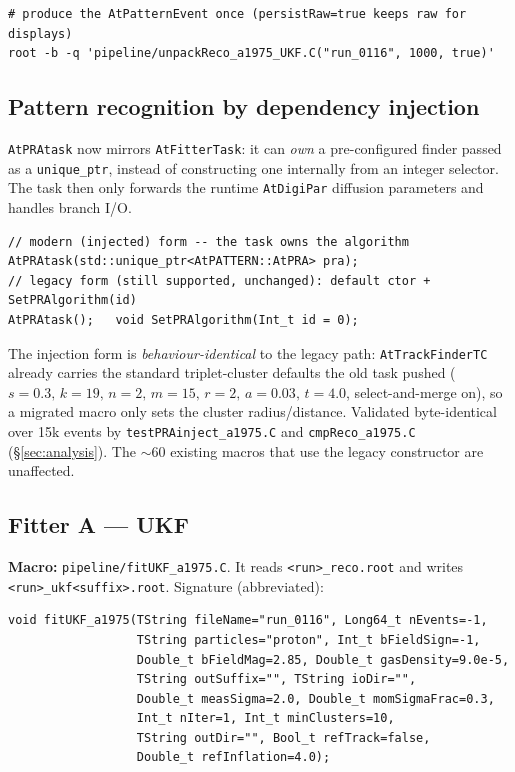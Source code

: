 \documentclass[11pt,a4paper]{article}
\newcommand{\code}[1]{\texttt{\small #1}}
\newcommand{\file}[1]{\texttt{\small #1}}
\begin{document}
\begin{lstlisting}[style=bash]
# produce the AtPatternEvent once (persistRaw=true keeps raw for displays)
root -b -q 'pipeline/unpackReco_a1975_UKF.C("run_0116", 1000, true)'
\end{lstlisting}

\subsection{Pattern recognition by dependency injection}\label{sec:prainject}

\code{AtPRAtask} now mirrors \code{AtFitterTask}: it can \emph{own} a
pre-configured finder passed as a \code{unique\_ptr}, instead of constructing one
internally from an integer selector. The task then only forwards the runtime
\code{AtDigiPar} diffusion parameters and handles branch I/O.

\begin{lstlisting}
// modern (injected) form -- the task owns the algorithm
AtPRAtask(std::unique_ptr<AtPATTERN::AtPRA> pra);
// legacy form (still supported, unchanged): default ctor + SetPRAlgorithm(id)
AtPRAtask();   void SetPRAlgorithm(Int_t id = 0);
\end{lstlisting}

\begin{notebox}
The injection form is \emph{behaviour-identical} to the legacy path:
\code{AtTrackFinderTC} already carries the standard triplet-cluster defaults the
old task pushed ($s{=}0.3,\,k{=}19,\,n{=}2,\,m{=}15,\,r{=}2,\,a{=}0.03,\,t{=}4.0$,
select-and-merge on), so a migrated macro only sets the cluster radius/distance.
Validated byte-identical over 15k events by \file{testPRAinject\_a1975.C} and
\file{cmpReco\_a1975.C} (\S\ref{sec:analysis}). The $\sim$60 existing macros that
use the legacy constructor are unaffected.
\end{notebox}

\subsection{Fitter A --- UKF}

\textbf{Macro:} \file{pipeline/fitUKF\_a1975.C}. It reads \file{<run>\_reco.root}
and writes \file{<run>\_ukf<suffix>.root}. Signature (abbreviated):

\begin{lstlisting}
void fitUKF_a1975(TString fileName="run_0116", Long64_t nEvents=-1,
                  TString particles="proton", Int_t bFieldSign=-1,
                  Double_t bFieldMag=2.85, Double_t gasDensity=9.0e-5,
                  TString outSuffix="", TString ioDir="",
                  Double_t measSigma=2.0, Double_t momSigmaFrac=0.3,
                  Int_t nIter=1, Int_t minClusters=10,
                  TString outDir="", Bool_t refTrack=false,
                  Double_t refInflation=4.0);
\end{lstlisting}
\end{document}
